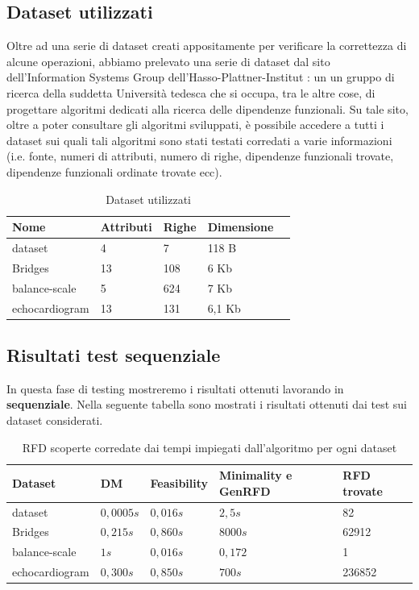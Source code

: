 \subsection{Dataset utilizzati}
Oltre ad una serie di dataset creati appositamente per verificare la correttezza di alcune operazioni, abbiamo prelevato una serie di dataset dal sito dell'Information Systems Group dell'Hasso-Plattner-Institut \cite{metanome}: un un gruppo di ricerca della suddetta Università tedesca che si occupa, tra le altre cose, di progettare algoritmi dedicati alla ricerca delle dipendenze funzionali. Su tale sito, oltre a poter consultare gli algoritmi sviluppati, è possibile accedere a tutti i dataset sui quali tali algoritmi sono stati testati corredati a varie informazioni (i.e. fonte, numeri di attributi, numero di righe, dipendenze funzionali trovate, dipendenze funzionali ordinate trovate ecc).\\
\begin{table}[H]
	\centering
	\begin{tabular}{lllll}
		Nome & Attributi & Righe & Dimensione \\
		\hline
		dataset & 4 & 7 & 118 B \\
		Bridges & 13  & 108 & 6 Kb\\
		balance-scale  & 5  & 624 & 7 Kb\\
		echocardiogram  & 13  & 131 & 6,1 Kb\\
	\end{tabular}
	\caption{Dataset utilizzati}
	\label{datasetUtilizzati}
\end{table}
\subsection{Risultati test sequenziale}
In questa fase di testing mostreremo i risultati ottenuti lavorando in \textbf{sequenziale}.
Nella seguente tabella sono mostrati i risultati ottenuti dai test sui dataset considerati.
\begin{table}[H]
	\centering
	\begin{tabular}{lllll}
		Dataset & DM & Feasibility & Minimality e GenRFD & RFD trovate \\
		\hline
		dataset& $0,0005s$ & $0,016s$ & $2,5s$ & 82 \\
		Bridges & $0,215s$  & $0,860s$ & $8000s$ & 62912 \\
		balance-scale  & $1s$  & $0,016s$ & $0,172$ & 1\\
		echocardiogram  & $0,300s$  & $0,850s$ & $700s$ & 236852\\
		\hline
	\end{tabular}
	\label{risultati}
	\caption{RFD scoperte corredate dai tempi impiegati dall'algoritmo per ogni dataset}
\end{table}
